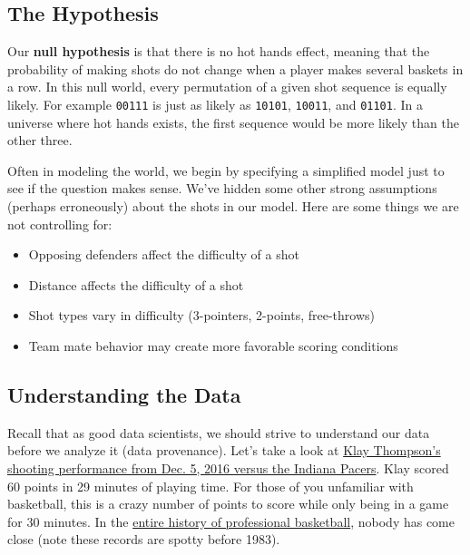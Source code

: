 \documentclass[11pt]{article}
\providecommand{\tightlist}{%
      \setlength{\itemsep}{0pt}\setlength{\parskip}{0pt}}
\begin{document}
    \subsection{The Hypothesis}\label{the-hypothesis}

Our \textbf{null hypothesis} is that there is no hot hands effect,
meaning that the probability of making shots do not change when a player
makes several baskets in a row. In this null world, every permutation of
a given shot sequence is equally likely. For example
\texttt{\textquotesingle{}00111\textquotesingle{}} is just as likely as
\texttt{\textquotesingle{}10101\textquotesingle{}},
\texttt{\textquotesingle{}10011\textquotesingle{}}, and
\texttt{\textquotesingle{}01101\textquotesingle{}}. In a universe where
hot hands exists, the first sequence would be more likely than the other
three.

Often in modeling the world, we begin by specifying a simplified model
just to see if the question makes sense. We've hidden some other strong
assumptions (perhaps erroneously) about the shots in our model. Here are
some things we are not controlling for:

\begin{itemize}
\tightlist
\item
  Opposing defenders affect the difficulty of a shot
\item
  Distance affects the difficulty of a shot
\item
  Shot types vary in difficulty (3-pointers, 2-points, free-throws)
\item
  Team mate behavior may create more favorable scoring conditions
\end{itemize}

\subsection{Understanding the Data}\label{understanding-the-data}

Recall that as good data scientists, we should strive to understand our
data before we analyze it (data provenance). Let's take a look at
\href{https://www.basketball-reference.com/play-index/shooting.fcgi?player_id=thompkl01\&year_id=2017\&opp_id=IND\&game_location=H}{Klay
Thompson's shooting performance from Dec. 5, 2016 versus the Indiana
Pacers}. Klay scored 60 points in 29 minutes of playing time. For those
of you unfamiliar with basketball, this is a crazy number of points to
score while only being in a game for 30 minutes. In the
\href{https://www.basketball-reference.com/play-index/pgl_finder.cgi?request=1\&match=game\&is_playoffs=N\&age_min=0\&age_max=99\&pos_is_g=Y\&pos_is_gf=Y\&pos_is_f=Y\&pos_is_fg=Y\&pos_is_fc=Y\&pos_is_c=Y\&pos_is_cf=Y\&c1stat=mp\&c1comp=lt\&c1val=30\&order_by=pts}{entire
history of professional basketball}, nobody has come close (note these
records are spotty before 1983).
\end{document}
